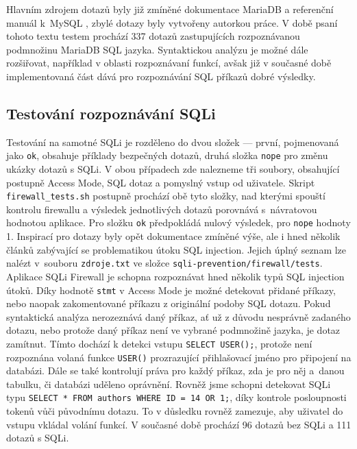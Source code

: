 Hlavním zdrojem dotazů byly již zmíněné dokumentace MariaDB \cite{MariaDB} a referenční manuál k~MySQL \cite{MySQL}, zbylé dotazy byly vytvořeny
autorkou práce. V době psaní tohoto textu testem prochází 337 dotazů zastupujících rozpoznávanou podmnožinu MariaDB SQL jazyka. Syntaktickou
analýzu je možné dále rozšiřovat, například v oblasti rozpoznávaní funkcí, avšak již v současné době implementovaná část dává pro rozpoznávání 
SQL příkazů dobré výsledky.

\subsection{Testování rozpoznávání SQLi}
Testování na samotné SQLi je rozděleno do dvou složek --- první, pojmenovaná jako \texttt{ok}, obsahuje příklady bezpečných dotazů, druhá složka 
\texttt{nope} pro změnu ukázky dotazů s SQLi. V obou případech zde nalezneme tři soubory, obsahující postupně Access Mode, SQL dotaz a pomyslný vstup 
od uživatele. Skript \texttt{firewall\_tests.sh} postupně prochází obě tyto složky, nad kterými spouští kontrolu firewallu a výsledek jednotlivých 
dotazů porovnává s~návratovou hodnotou aplikace. Pro složku \texttt{ok} předpokládá nulový výsledek, pro \texttt{nope} hodnoty 1. Inspirací pro 
dotazy byly opět dokumentace zmíněné výše, ale i hned několik článků zabývající se problematikou útoku SQL injection. Jejich úplný seznam lze nalézt 
v~souboru \texttt{zdroje.txt} ve složce \texttt{sqli-prevention/firewall/tests}. \\

Aplikace SQLi Firewall je schopna rozpoznávat hned několik typů SQL injection útoků. Díky hodnotě \texttt{stmt} v Access Mode je možné
detekovat přidané příkazy, nebo naopak zakomentované příkazu z originální podoby SQL dotazu. Pokud syntaktická analýza nerozeznává daný
příkaz, ať už z důvodu nesprávně zadaného dotazu, nebo protože daný příkaz není ve vybrané podmnožině jazyka, je dotaz zamítnut.
Tímto dochází k detekci vstupu \texttt{SELECT USER();}, protože není rozpoznána volaná funkce \texttt{USER()} prozrazující přihlašovací jméno
pro připojení na databázi. Dále se také kontrolují práva pro každý příkaz, zda je pro něj a~danou tabulku, či databázi uděleno oprávnění.
Rovněž jsme schopni detekovat SQLi typu \texttt{SELECT * FROM authors WHERE ID = 14 OR 1;}, díky kontrole posloupnosti tokenů vůči
původnímu dotazu. To v důsledku rovněž zamezuje, aby uživatel do vstupu vkládal volání funkcí. V současné době prochází 96 dotazů
bez SQLi a 111 dotazů s SQLi.

